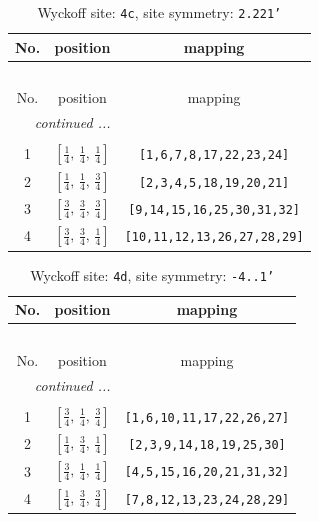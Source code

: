 \documentclass[fleqn,8pt]{jsarticle}
\begin{document}
\renewcommand{\arraystretch}{1.2}
\begin{longtable}{ccc}
\caption{Wyckoff site: {\tt 4c}, site symmetry: {\tt 2.221'}}
 \\
 \hline \hline
No. & position & mapping \\ \hline \endfirsthead

\multicolumn{2}{l}{\tablename\ \thetable{}} \\
 \hline \hline
No. & position & mapping \\ \hline \endhead

 \hline \hline
\multicolumn{2}{r}{\footnotesize\it continued ...} \\ \endfoot

 \hline \hline
\multicolumn{2}{r}{} \\ \endlastfoot

1 & $\left[ \frac{1}{4},\, \frac{1}{4},\, \frac{1}{4} \right]$ & {\tt [1,6,7,8,17,22,23,24]} \\ \hline
2 & $\left[ \frac{1}{4},\, \frac{1}{4},\, \frac{3}{4} \right]$ & {\tt [2,3,4,5,18,19,20,21]} \\ \hline
3 & $\left[ \frac{3}{4},\, \frac{3}{4},\, \frac{3}{4} \right]$ & {\tt [9,14,15,16,25,30,31,32]} \\ \hline
4 & $\left[ \frac{3}{4},\, \frac{3}{4},\, \frac{1}{4} \right]$ & {\tt [10,11,12,13,26,27,28,29]} \\
\end{longtable}
\renewcommand{\arraystretch}{1.2}
\begin{longtable}{ccc}
\caption{Wyckoff site: {\tt 4d}, site symmetry: {\tt -4..1'}}
 \\
 \hline \hline
No. & position & mapping \\ \hline \endfirsthead

\multicolumn{2}{l}{\tablename\ \thetable{}} \\
 \hline \hline
No. & position & mapping \\ \hline \endhead

 \hline \hline
\multicolumn{2}{r}{\footnotesize\it continued ...} \\ \endfoot

 \hline \hline
\multicolumn{2}{r}{} \\ \endlastfoot

1 & $\left[ \frac{3}{4},\, \frac{1}{4},\, \frac{3}{4} \right]$ & {\tt [1,6,10,11,17,22,26,27]} \\ \hline
2 & $\left[ \frac{1}{4},\, \frac{3}{4},\, \frac{1}{4} \right]$ & {\tt [2,3,9,14,18,19,25,30]} \\ \hline
3 & $\left[ \frac{3}{4},\, \frac{1}{4},\, \frac{1}{4} \right]$ & {\tt [4,5,15,16,20,21,31,32]} \\ \hline
4 & $\left[ \frac{1}{4},\, \frac{3}{4},\, \frac{3}{4} \right]$ & {\tt [7,8,12,13,23,24,28,29]} \\
\end{longtable}
\end{document}
